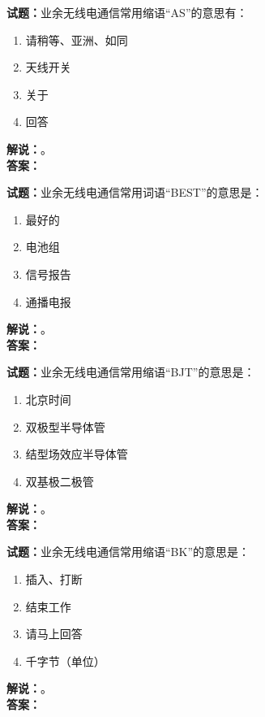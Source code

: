 \documentclass{ctexbook}
\begin{document}
\vspace{\baselineskip}

\noindent\textbf{试题：}业余无线电通信常用缩语“AS”的意思有：
\begin{enumerate}[leftmargin=3em]
  \item 请稍等、亚洲、如同
  \item 天线开关
  \item 关于
  \item 回答
\end{enumerate}
\noindent\textbf{解说：}\textbf{}。\\\noindent\textbf{答案：}

\vspace{\baselineskip}

\noindent\textbf{试题：}业余无线电通信常用词语“BEST”的意思是：
\begin{enumerate}[leftmargin=3em]
  \item 最好的
  \item 电池组
  \item 信号报告
  \item 通播电报
\end{enumerate}
\noindent\textbf{解说：}\textbf{}。\\\noindent\textbf{答案：}

\vspace{\baselineskip}

\noindent\textbf{试题：}业余无线电通信常用缩语“BJT”的意思是：
\begin{enumerate}[leftmargin=3em]
  \item 北京时间
  \item 双极型半导体管
  \item 结型场效应半导体管
  \item 双基极二极管
\end{enumerate}
\noindent\textbf{解说：}\textbf{}。\\\noindent\textbf{答案：}

\vspace{\baselineskip}

\noindent\textbf{试题：}业余无线电通信常用缩语“BK”的意思是：
\begin{enumerate}[leftmargin=3em]
  \item 插入、打断
  \item 结束工作
  \item 请马上回答
  \item 千字节（单位）
\end{enumerate}
\noindent\textbf{解说：}\textbf{}。\\\noindent\textbf{答案：}
\end{document}
